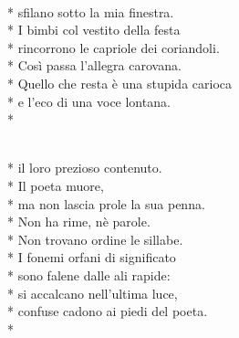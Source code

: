 \documentclass[12pt]{book}
\begin{document}
\begin{poem}{}{}

\begin{altverse}
\\*
sfilano sotto la mia finestra.\\*
I bimbi col vestito della festa\\*
rincorrono le capriole dei coriandoli.\\*
Così passa l'allegra carovana.\\*
Quello che resta è una stupida carioca\\*
e l'eco di una voce lontana.\\*
\end{altverse}

\end{poem}

\begin{poem}{}{}

\begin{altverse}
\\*
il loro prezioso contenuto.\\*
Il poeta muore,\\*
ma non lascia prole la sua penna.\\*
Non ha rime, nè parole.\\*
Non trovano ordine le sillabe.\\*
I fonemi orfani di significato\\*
sono falene dalle ali rapide:\\*
si accalcano nell'ultima luce,\\*
confuse cadono ai piedi del poeta.\\*
\end{altverse}

\end{poem}
\end{document}

